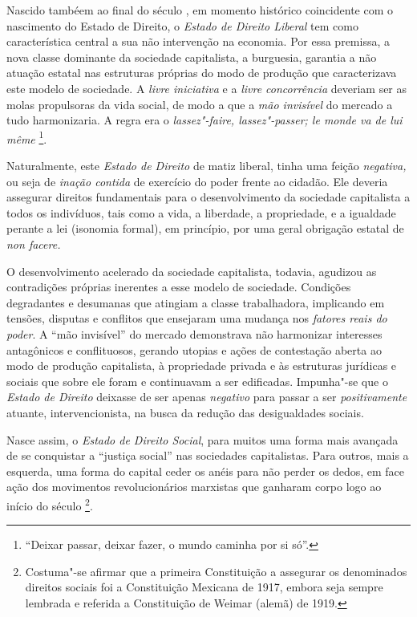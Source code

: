 Nascido tambéem ao final do século , em momento histórico
coincidente com o nascimento do Estado de Direito, o \emph{Estado de
Direito Liberal} tem como característica central a sua não intervenção
na economia. Por essa premissa, a nova classe dominante da sociedade
capitalista, a burguesia, garantia a não atuação estatal nas estruturas
próprias do modo de produção que caracterizava este modelo de sociedade.
A \emph{livre iniciativa} e a \emph{livre concorrência} deveriam ser as
molas propulsoras da vida social, de modo a que a \emph{mão invisível}
do mercado a tudo harmonizaria. A regra era o \emph{lassez"-faire,
lassez"-passer; le monde va de lui même} \footnote{``Deixar
  passar, deixar fazer, o mundo caminha por si só''.}.

Naturalmente, este \emph{Estado de Direito} de matiz liberal, tinha
uma feição \emph{negativa,} ou seja de \emph{inação contida} de
exercício do poder frente ao cidadão. Ele deveria assegurar direitos
fundamentais para o desenvolvimento da sociedade capitalista a todos os
indivíduos, tais como a vida, a liberdade, a propriedade, e a igualdade
perante a lei (isonomia formal), em princípio, por uma geral obrigação
estatal de \emph{non facere.}

O desenvolvimento acelerado da sociedade capitalista, todavia, agudizou
as contradições próprias inerentes a esse modelo de sociedade. Condições
degradantes e desumanas que atingiam a classe trabalhadora, implicando
em tensões, disputas e conflitos que ensejaram uma mudança nos
\emph{fatores reais do poder}. A ``mão invisível'' do mercado
demonstrava não harmonizar interesses antagônicos e conflituosos,
gerando utopias e ações de contestação aberta ao modo de produção
capitalista, à propriedade privada e às estruturas jurídicas e sociais
que sobre ele foram e continuavam a ser edificadas. Impunha"-se que o
\emph{Estado de Direito} deixasse de ser apenas \emph{negativo} para
passar a ser \emph{positivamente} atuante, intervencionista, na busca da
redução das desigualdades sociais.

Nasce assim, o \emph{Estado de Direito Social}, para muitos uma forma
mais avançada de se conquistar a ``justiça social'' nas
sociedades capitalistas. Para outros, mais a esquerda, uma forma do
capital ceder os anéis para não perder os dedos, em face ação dos
movimentos revolucionários marxistas que ganharam corpo logo ao início
do século \footnote{Costuma"-se afirmar que a primeira Constituição a
  assegurar os denominados direitos sociais foi a Constituição Mexicana
  de 1917, embora seja sempre lembrada e referida a Constituição de
  Weimar (alemã) de 1919.}.

